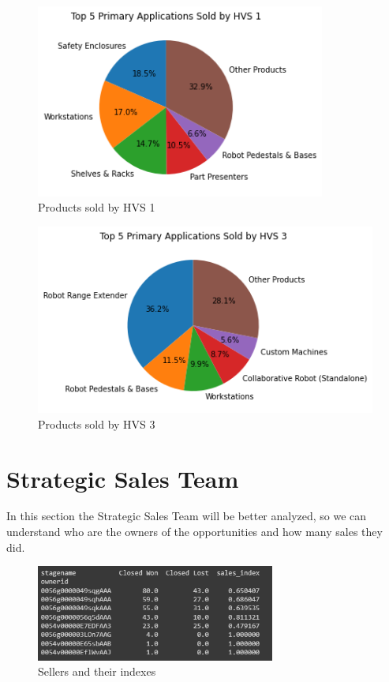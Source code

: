 \documentclass[]{report}
\begin{document}
\begin{figure}[htb]
	\centering
	\includegraphics[width=0.85\textwidth]{fig_03_hvs_1}
	\caption{Products sold by HVS 1}
	\label{fig:fig_03b}
\end{figure}

\begin{figure}[!t]
	\centering
	\includegraphics[width=1\textwidth]{fig_03_hvs_3}
	\caption{Products sold by HVS 3}
	\label{fig:fig_03c}
\end{figure}


\clearpage
\section{Strategic Sales Team}

In this section the Strategic Sales Team will be better analyzed, so we can understand who are the owners of the opportunities and how many sales they did. 

\begin{figure}[htb]
	\centering
	\includegraphics[width=0.70\textwidth]{fig_04_sellers}
	\caption{Sellers and their indexes}
	\label{fig:fig_04}
\end{figure}
\end{document}
